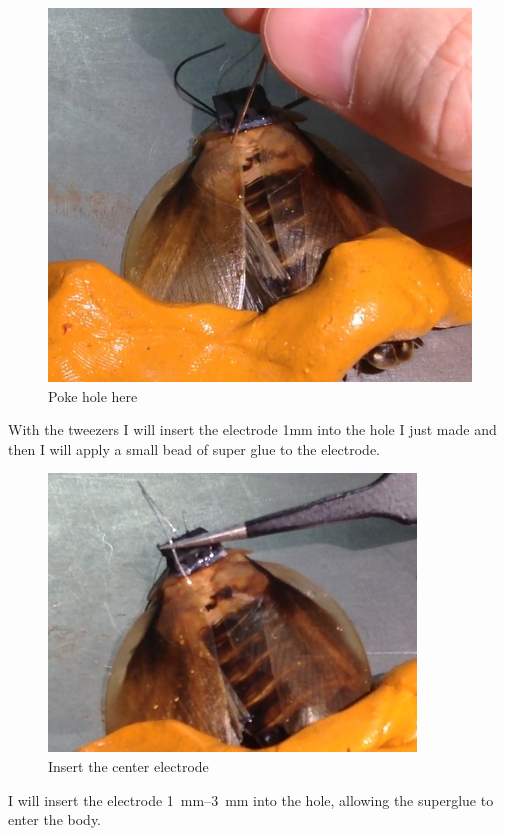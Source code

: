 {\begin{figure}[ht!]
\centering
\includegraphics[scale=0.3]{Surgery Photos/hole.jpg}
\caption{Poke hole here}
\label{fig:hole}
\end{figure}}
With the tweezers I will insert the electrode 1mm into the hole I just made and then I will apply a small bead of super glue to the electrode.
{\begin{figure}[ht!]
\centering
\includegraphics[scale=0.4]{Surgery Photos/celectrode1.jpg}
\caption{Insert the center electrode}
\label{fig:celectrode1}
\end{figure}}
I will insert the electrode \SIrange{1}{3}{\milli\meter} into the hole, allowing the superglue to enter the body. 
